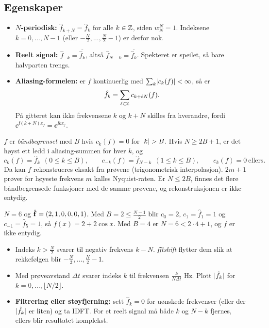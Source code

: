 \subsection{Egenskaper}
\begin{teorem}
\begin{itemize}
  \item \textbf{$N$-periodisk:} $\hat f_{k+N}=\hat f_k$ for alle $k\in\mathbb{Z}$, siden $w_N^N=1$. Indeksene $k=0,\dots,N-1$ (eller $-\frac N2,\dots,\frac N2-1$) er derfor nok.
  \item \textbf{Reelt signal:} $\hat f_{-k}=\overline{\hat f_k}$, altså $\hat f_{N-k}=\overline{\hat f_k}$. Spekteret er speilet, så bare halvparten trengs.
  \item \textbf{Aliasing-formelen:} er $f$ kontinuerlig med $\sum_k\lvert c_k(f)\rvert<\infty$, så er
  \[
  \hat f_k=\sum_{\ell\in\mathbb{Z}}c_{k+\ell N}(f).
  \]
  På gitteret kan ikke frekvensene $k$ og $k+N$ skilles fra hverandre, fordi $\ee^{\ii(k+N)x_j}=\ee^{\ii kx_j}$.
\end{itemize}
\end{teorem}

\begin{teorem}
$f$ er \emph{båndbegrenset} med $B$ hvis $c_k(f)=0$ for $\lvert k\rvert>B$. Hvis $N\ge2B+1$, er det høyst ett ledd i aliasing-summen for hver $k$, og
\[
c_k(f)=\hat f_k\ \ (0\le k\le B),\qquad c_{-k}(f)=\hat f_{N-k}\ \ (1\le k\le B),\qquad c_k(f)=0\ \text{ellers}.
\]
Da kan $f$ rekonstrueres eksakt fra prøvene (trigonometrisk interpolasjon). $2m+1$ prøver for høyeste frekvens $m$ kalles Nyquist-raten. Er $N\le 2B$, finnes det flere båndbegrensede funksjoner med de samme prøvene, og rekonstruksjonen er ikke entydig.
\end{teorem}
\begin{eksempel}
$N=6$ og $\hat{\mathbf{f}}=(2,1,0,0,0,1)$. Med $B=2\le\frac{N-1}2$ blir $c_0=2$, $c_1=\hat f_1=1$ og $c_{-1}=\hat f_5=1$, så $f(x)=2+2\cos x$. Med $B=4$ er $N=6<2\cdot4+1$, og $f$ er ikke entydig.
\end{eksempel}

\begin{oppskrift}
\begin{itemize}
  \item Indeks $k>\frac N2$ svarer til negativ frekvens $k-N$. \emph{fftshift} flytter dem slik at rekkefølgen blir $-\frac N2,\dots,\frac N2-1$.
  \item Med prøveavstand $\Delta t$ svarer indeks $k$ til frekvensen $\frac{k}{N\Delta t}$ Hz. Plott $\lvert \hat f_k\rvert$ for $k=0,\dots,\lfloor N/2\rfloor$.
  \item \textbf{Filtrering eller støyfjerning:} sett $\hat f_k=0$ for uønskede frekvenser (eller der $\lvert \hat f_k\rvert$ er liten) og ta IDFT. For et reelt signal må både $k$ og $N-k$ fjernes, ellers blir resultatet komplekst.
\end{itemize}
\end{oppskrift}

